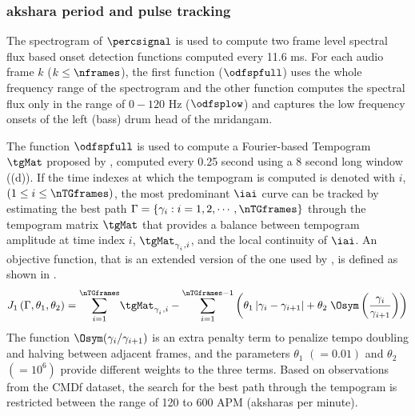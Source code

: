 \subsubsection{\Gls{akshara} period and pulse tracking}
The spectrogram of $\percsignal$ is used to compute two frame level spectral flux based onset detection functions \cite{bello:05:onset} computed every 11.6 ms. For each audio frame $k$ ($k \leq \nframes$), the first function ($\odfspfull$) uses the whole frequency range of the spectrogram and the other function computes the spectral flux only in the range of $0-120$ Hz ($\odfsplow$) and captures the low frequency onsets of the left (bass) drum head of the mridangam. 

The function $\odfspfull$ is used to compute a Fourier-based Tempogram $\tgMat$ proposed by \cite{grosche:11:tempogram}, computed every 0.25 second using a 8 second long window ((d)). If the time indexes at which the tempogram is computed is denoted with $i$, $(1\leq i \leq \nTGframes)$, the most predominant $\iai$ curve can be tracked by estimating the best path $\Gamma = \{\gamma_i: i = 1,2, \cdots, \nTGframes\}$ through the tempogram matrix $\tgMat$ that provides a balance between tempogram amplitude at time index $i$, $\tgMat_{\gamma_{_{i}},i}$, and the local continuity of $\iai$. An objective function, that is an extended version of the one used by , is defined as shown in . 
%
\begin{equation}\label{eqn:iai:icassp14}
J_{1}\left(\Gamma,\theta_{1},\theta_{2}\right)=\underset{i=1}{\overset{\nTGframes}{\sum}}\tgMat_{\gamma_{_{i}},i}-\underset{i=1}{\overset{\nTGframes-1}{\sum}}\left(\theta_{1}\left|\gamma_{i}-\gamma_{i+1}\right|+\theta_{2}\;\Osym\left(\frac{\gamma_{i}}{\gamma_{i+1}}\right)\right) 
\end{equation}
The function $\Osym(\gamma_i/\gamma_{i+1})$ is an extra penalty term to penalize tempo doubling and halving between adjacent frames, and the parameters $\theta_1$ $(= 0.01)$ and $\theta_2$ $(= 10^6)$ provide different weights to the three terms. Based on observations from the \acrshort{CMDf} dataset, the search for the best path through the tempogram is restricted between the range of 120 to 600 APM (\glspl{akshara} per minute). 

